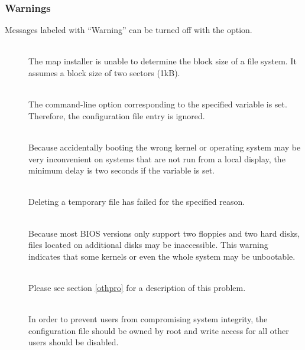 \subsubsection{Warnings}
\label{warnings}

Messages labeled with ``Warning'' can be turned off with the 
option.

\begin{description}
  \item[]~\\
    The map installer is unable to determine the block size of a file system.
    It assumes a block size of two sectors (1kB).
  \item[]~\\
    The command-line option corresponding to the specified variable is set.
    Therefore, the configuration file entry is ignored.
  \item[]~\\
    Because accidentally booting the wrong kernel or operating system may
    be very inconvenient on systems that are not run from a local display,
    the minimum delay is two seconds if the  variable is set.
  \item[]~\\
    Deleting a temporary file has failed for the specified reason.
  \item[]~\\
    Because most BIOS versions only support two floppies and two hard disks,
    files located on additional disks may be inaccessible. This warning
    indicates that some kernels or even the whole system may be unbootable.
  \item[]~\\
    Please see section \ref{othpro} for a description of this problem.
  \item[]~\\
    In order to prevent users from compromising system integrity, the
    configuration file should be owned by root and write access for all other
    users should be disabled.
  \item[]~\\

\end{description}
